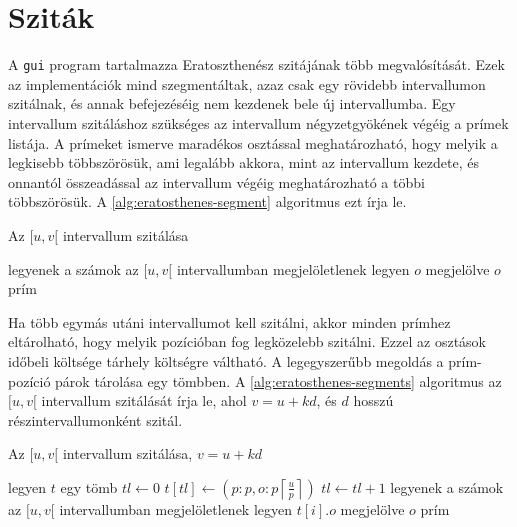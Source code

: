 \section{Sziták}

A \texttt{gui} program tartalmazza Eratoszthenész szitájának több megvalósítását.
Ezek az implementációk mind szegmentáltak, azaz csak egy rövidebb intervallumon szitálnak,
és annak befejezéséig nem kezdenek bele új intervallumba.
Egy intervallum szitáláshoz szükséges az intervallum négyzetgyökének végéig a prímek listája.
A prímeket ismerve maradékos osztással meghatározható, hogy melyik a legkisebb többszörösük, ami legalább akkora, mint az intervallum kezdete, és onnantól összeadással az intervallum végéig meghatározható a többi többszörösük.
A \ref{alg:eratosthenes-segment} algoritmus ezt írja le.

\begin{algorithm}
\caption{Az $[u, v[$ intervallum szitálása}
\label{alg:eratosthenes-segment}
\begin{algorithmic}[1]
\State legyenek a számok az $[u, v[$ intervallumban megjelöletlenek
		\State legyen $o$ megjelölve
	\EndFor
\EndFor
\For{$o \in [u, v[$}
		\State $o$ prím
	\EndIf
\EndFor
\end{algorithmic}
\end{algorithm}

Ha több egymás utáni intervallumot kell szitálni, akkor minden prímhez eltárolható, hogy melyik pozícióban fog legközelebb szitálni.
Ezzel az osztások időbeli költsége tárhely költségre váltható.
A legegyszerűbb megoldás a prím-pozíció párok tárolása egy tömbben.
A \ref{alg:eratosthenes-segments} algoritmus az $[u, v[$ intervallum szitálását írja le, ahol $v=u+kd$, és $d$ hosszú részintervallumonként szitál.

\begin{algorithm}
\caption{Az $[u, v[$ intervallum szitálása, $v=u+kd$}
\label{alg:eratosthenes-segments}
\begin{algorithmic}[1]
\State legyen $t$ egy tömb
\State $tl \gets 0$ 
	\State $t[tl] \gets (p: p, o: p \left \lceil{\frac{u}{p}}\right \rceil)$
	\State $tl \gets tl+1$
\EndFor
{}
	\State legyenek a számok az $[u, v[$ intervallumban megjelöletlenek
			\State legyen $t[i].o$ megjelölve
		\EndFor
	\EndFor
	\For{$o \in [u, v[$}
			\State $o$ prím
		\EndIf
	\EndFor
\EndFor
\end{algorithmic}
\end{algorithm}

